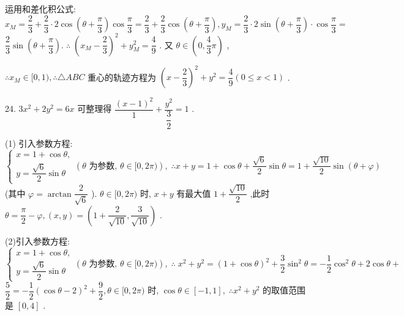 运用和差化积公式: ${x}_{M} = \dfrac{2}{3} + \dfrac{2}{3} \cdot  2\cos \left( {\theta  + \dfrac{\pi }{3}}\right) \cos \dfrac{\pi }{3} = \dfrac{2}{3} + \dfrac{2}{3}\cos \left( {\theta  + \dfrac{\pi }{3}}\right) ,{y}_{M} = \dfrac{2}{3} \cdot  2\sin \left( {\theta  + \dfrac{\pi }{3}}\right)  \cdot  \cos \dfrac{\pi }{3} =$  $\dfrac{2}{3}\sin \left( {\theta  + \dfrac{\pi }{3}}\right) .\;\therefore \;{\left( {x}_{M} - \dfrac{2}{3}\right) }^{2} + {y}_{M}^{2} = \dfrac{4}{9}$ . 又 $\theta  \in  \left( {0,\dfrac{4}{3}\pi }\right)$ ,

$\therefore {x}_{M} \in  \lbrack 0,1),\therefore \bigtriangleup {ABC}$ 重心的轨迹方程为 ${\left( x - \dfrac{2}{3}\right) }^{2} + {y}^{2} = \dfrac{4}{9}\left( {0 \leq  x < 1}\right)$ .

24. $3{x}^{2} + 2{y}^{2} = {6x}$ 可整理得 $\dfrac{{\left( x - 1\right) }^{2}}{1} + \dfrac{{y}^{2}}{\dfrac{3}{2}} = 1$ .

(1) 引入参数方程: $\left\{  {\begin{array}{l} x = 1 + \cos \theta , \\  y = \dfrac{\sqrt{6}}{2}\sin \theta  \end{array}\left( {\theta \text{ 为参数, }\theta  \in  \lbrack 0,{2\pi })}\right) ,\;\therefore x + y = 1 + \cos \theta  + \dfrac{\sqrt{6}}{2}\sin \theta  = 1 + \dfrac{\sqrt{10}}{2}\sin \left( {\theta  + \varphi }\right) }\right.$ (其中 $\varphi  = \arctan \dfrac{2}{\sqrt{6}}$ ). $\theta  \in  \lbrack 0,{2\pi })$ 时, $x + y$ 有最大值 $1 + \dfrac{\sqrt{10}}{2}$ ,此时 $\theta  = \dfrac{\pi }{2} - \varphi ,\left( {x,y}\right)  = \left( {1 + \dfrac{2}{\sqrt{10}},\dfrac{3}{\sqrt{10}}}\right)$ .

(2)引入参数方程: $\left\{  {\begin{array}{l} x = 1 + \cos \theta , \\  y = \dfrac{\sqrt{6}}{2}\sin \theta  \end{array}\left( {\theta \text{ 为参数, }\theta  \in  \lbrack 0,{2\pi })}\right) ,\;\therefore \;{x}^{2} + {y}^{2} = {\left( 1 + \cos \theta \right) }^{2} + \dfrac{3}{2}{\sin }^{2}\theta  =  - \dfrac{1}{2}{\cos }^{2}\theta  + 2\cos \theta  + }\right.$  $\dfrac{5}{2} =  - \dfrac{1}{2}{\left( \cos \theta  - 2\right) }^{2} + \dfrac{9}{2},\theta  \in  \lbrack 0,{2\pi })$ 时, $\cos \theta  \in  \left\lbrack  {-1,1}\right\rbrack  ,\;\therefore {x}^{2} + {y}^{2}$ 的取值范围是 $\left\lbrack  {0,4}\right\rbrack$ .

